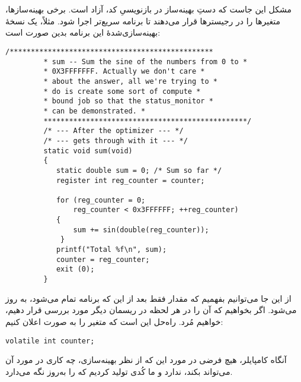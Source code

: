 \section{}
\paragraph{}\label{answer:114}
مشکل این جاست که دستِ بهینه‌ساز در بازنویسیِ کد، آزاد است. برخی بهینه‌سازها، متغیرها را در رجیسترها قرار می‌دهند تا برنامه سریع‌تر اجرا شود. مثلاً، یک نسخهٔ بهینه‌سازی‌شدهٔ این برنامه بدین صورت است:
\begin{LTR}
    \begin{lstlisting}[style=C++Style]
        /************************************************
         * sum -- Sum the sine of the numbers from 0 to *
         * 0X3FFFFFFF. Actually we don't care *
         * about the answer, all we're trying to *
         * do is create some sort of compute *
         * bound job so that the status_monitor *
         * can be demonstrated. *
         ************************************************/
         /* --- After the optimizer --- */
         /* --- gets through with it --- */
         static void sum(void)
         {
         	static double sum = 0; /* Sum so far */
         	register int reg_counter = counter;

         	for (reg_counter = 0;
         		reg_counter < 0x3FFFFFF; ++reg_counter)
         	{
         		sum += sin(double(reg_counter));
        	 }
         	printf("Total %f\n", sum);
         	counter = reg_counter;
         	exit (0);
         }
    \end{lstlisting}
\end{LTR}

از این جا می‌توانیم بفهمیم که مقدار  فقط بعد از این که برنامه تمام می‌شود، به روز می‌شود. اگر بخواهیم که آن را در هر لحظه در ریسمان دیگر مورد بررسی قرار دهیم، خواهیم مُرد. راه‌حل این است که متغیر را به صورت  اعلان کنیم:
\begin{LTR}
    \begin{lstlisting}[style=C++Style]
        volatile int counter;
    \end{lstlisting}
\end{LTR}

آنگاه کامپایلر، هیچ فرضی در مورد این که از نظر بهینه‌سازی، چه کاری در مورد آن می‌تواند بکند، ندارد و ما کُدی تولید کردیم که  را به‌روز نگه می‌دارد.